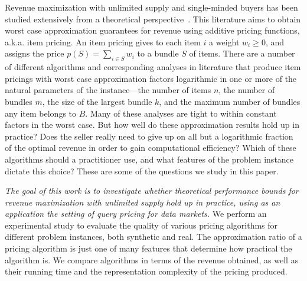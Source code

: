 Revenue maximization with unlimited supply and single-minded buyers has been studied extensively from a theoretical perspective~\cite{guruswami2005profit,balcan2006approximation,briest2006single}. This literature aims to obtain worst case approximation guarantees for revenue using additive pricing functions, a.k.a. item pricing. An item pricing gives to each item $i$  a weight $w_i \geq 0$, and assigns the price $p(S) = \sum_{i \in S} w_i$ to a bundle $S$ of items. There are a number of different algorithms and corresponding analyses in literature that produce item pricings with worst case approximation factors logarithmic in one or more of the natural parameters of the instance---the number of items $n$, the number of bundles $m$, the size of the largest bundle $k$, and the maximum number of bundles any item belongs to $B$. Many of these analyses are tight to within constant factors in the worst case. But how well do these approximation results hold up in practice? Does the seller really need to give up on all but a logarithmic fraction of the optimal revenue in order to gain computational efficiency? Which of these algorithms should a practitioner use, and what features of the problem instance dictate this choice? These are some of the questions we study in this paper.

\vspace{1em}
{\em The goal of this work is to investigate whether theoretical performance bounds for revenue maximization with unlimited supply hold up in practice, using as an application the setting of query pricing for data markets.} We perform an experimental study to evaluate the quality of various pricing algorithms for different problem instances, both synthetic and real. The approximation ratio of a pricing algorithm is just one of many features that determine how practical the algorithm is. We compare algorithms in terms of the revenue obtained, as well as their running time and the representation complexity of the pricing produced. 

